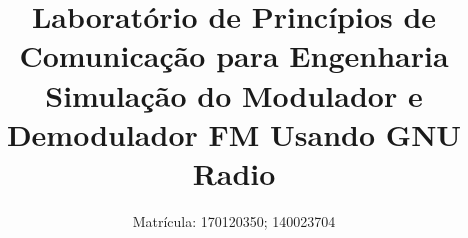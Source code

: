 \title{\large{Laboratório de Princípios de Comunicação para Engenharia \\ Simulação do Modulador e Demodulador FM Usando GNU Radio}}

\newif\iffinal
\finalfalse
\finaltrue
\newcommand{\jemsid}{99999}

\iffinal

\author{
Matrícula: 170120350; 140023704\\
 }

\else
  \author{Sibgrapi paper ID: \jemsid \\ }
\fi